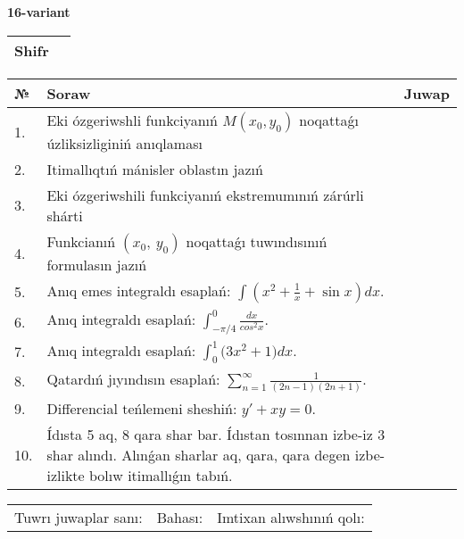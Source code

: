 \documentclass{article}
\begin{document}
  \egroup
  
  \newpage
  
  
  \textbf{16-variant}\\
  
  \bgroup
  \def\arraystretch{1.6} %
  
  \begin{tabular}{|m{5.7cm}|m{9.5cm}|}
  \hline
  Shifr & \\
  \hline
  \end{tabular}
  
  \vspace{1cm}
  
  \begin{tabular}{|m{0.7cm}|m{10cm}|m{4cm}|}
  \hline
  № & Soraw & Juwap \\
  \hline
  1. & Eki ózgeriwshli funkciyanıń \(M(x_{0}, y_{0})\) noqattaǵı úzliksizliginiń anıqlaması &  \\
  \hline
  2. & Itimallıqtıń mánisler oblastın jazıń &  \\
  \hline
  3. & Eki ózgeriwshili funkciyanıń ekstremumınıń zárúrli shárti &  \\
  \hline
  4. & Funkcianıń \((x_{0},\ y_{0})\) noqattaǵı tuwındısınıń formulasın jazıń &  \\
  \hline
  5. & Anıq emes integraldı esaplań: \(\int{\left( x^2  + \frac{1}{x} + \sin x \right)dx}\). &  \\
  \hline
  6. & Anıq integraldı esaplań: \(\int_{- \pi/4}^{0}\frac{dx}{cos^2 x}\). &  \\
  \hline
  7. & Anıq integraldı esaplań: \(\int_{0}^{1}{(3x^2 } + 1)dx\). &  \\
  \hline
  8. & Qatardıń jıyındısın esaplań: \(\sum_{n = 1}^{\infty}\frac{1}{(2n - 1)(2n + 1)}\). &  \\
  \hline
  9. & Differencial teńlemeni sheshiń: \(y' + xy = 0\). &  \\
  \hline
  10. & Ídısta 5 aq, 8 qara shar bar. Ídıstan tosınnan izbe-iz 3 shar alındı. Alınǵan sharlar aq, qara, qara degen izbe-izlikte bolıw itimallıǵın tabıń. &  \\
  \hline
  \end{tabular}
  
  \vspace{1cm}
  
  \begin{tabular}{lll}
  Tuwrı juwaplar sanı: \underline{\hspace{1.5cm}} & 
  Bahası: \underline{\hspace{1.5cm}} & 
  Imtixan alıwshınıń qolı: \underline{\hspace{2cm}} \\
  \end{tabular}
  
\end{document}
